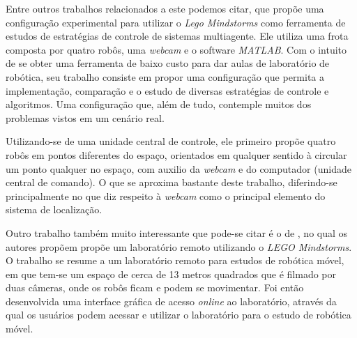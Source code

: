 Entre outros trabalhos relacionados a este podemos citar,  que propõe uma configuração experimental para utilizar o \emph{Lego  Mindstorms\textregistered} como ferramenta de estudos de estratégias de controle de sistemas multiagente. Ele utiliza uma frota composta por quatro robôs, uma \emph{webcam} e o software \emph{MATLAB{\textregistered}}. Com o intuito de se obter uma ferramenta de baixo custo para dar aulas de laboratório de robótica, seu trabalho consiste em propor uma configuração que permita a implementação, comparação e o estudo de diversas estratégias de controle e algoritmos. Uma configuração que, além de tudo, contemple muitos dos problemas vistos em um cenário real. 

Utilizando-se de uma unidade central de controle, ele primeiro propõe quatro robôs em pontos diferentes do espaço, orientados em qualquer sentido à circular um ponto qualquer no espaço, com auxilio da \emph{webcam} e do computador (unidade central de comando). O que se aproxima bastante deste trabalho, diferindo-se principalmente no que diz respeito à \emph{webcam} como o principal elemento do sistema de localização. %

Outro trabalho também muito interessante que pode-se citar é o de , no qual os autores propõem propõe um laboratório remoto utilizando o \emph{LEGO  Mindstorms\textregistered}. O trabalho se resume  a um laboratório remoto para estudos de robótica móvel, em que tem-se um espaço de cerca de 13 metros quadrados que é filmado por duas câmeras, onde os robôs ficam e podem se movimentar. Foi então desenvolvida uma interface gráfica de acesso \emph{online} ao laboratório, através da qual os usuários podem acessar e utilizar o laboratório para o estudo de robótica móvel. 

